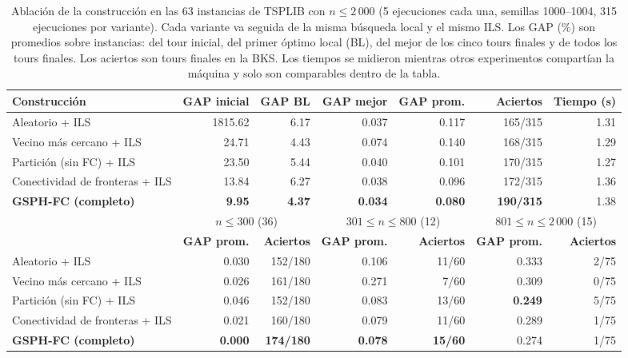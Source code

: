 \documentclass[runningheads]{llncs}
\begin{document}
\begin{table}
\caption{Ablación de la construcción en las 63 instancias de TSPLIB con
$n\le 2\,000$ (5 ejecuciones cada una, semillas 1000--1004, 315
ejecuciones por variante). Cada variante va seguida de la misma búsqueda
local y el mismo ILS. Los GAP (\%) son promedios sobre instancias: del
tour inicial, del primer óptimo local (BL), del mejor de los cinco tours
finales y de todos los tours finales. Los aciertos son tours finales en
la BKS. Los tiempos se midieron mientras otros experimentos compartían
la máquina y solo son comparables dentro de la tabla.}
\label{tab:ablation-constr}
\centering\scriptsize
\begin{tabular}{@{}lrrrrrr@{}}
\toprule
\textbf{Construcción} & \textbf{GAP inicial} & \textbf{GAP BL} & \textbf{GAP mejor} & \textbf{GAP prom.} & \textbf{Aciertos} & \textbf{Tiempo (s)}\\
\midrule
Aleatorio + ILS                  & 1815.62 & 6.17 & 0.037 & 0.117 & 165/315 & 1.31 \\
Vecino más cercano + ILS         &   24.71 & 4.43 & 0.074 & 0.140 & 168/315 & 1.29 \\
Partición (sin FC) + ILS         &   23.50 & 5.44 & 0.040 & 0.101 & 170/315 & 1.27 \\
Conectividad de fronteras + ILS  &   13.84 & 6.27 & 0.038 & 0.096 & 172/315 & 1.36 \\
\textbf{GSPH-FC (completo)}      & \textbf{9.95} & \textbf{4.37} & \textbf{0.034} & \textbf{0.080} & \textbf{190/315} & 1.38 \\
\midrule
& \multicolumn{2}{c}{$n\le 300$ (36)} & \multicolumn{2}{c}{$301\le n\le 800$ (12)} & \multicolumn{2}{c}{$801\le n\le 2\,000$ (15)}\\
\cmidrule(lr){2-3}\cmidrule(lr){4-5}\cmidrule(lr){6-7}
& \textbf{GAP prom.} & \textbf{Aciertos} & \textbf{GAP prom.} & \textbf{Aciertos} & \textbf{GAP prom.} & \textbf{Aciertos}\\
\midrule
Aleatorio + ILS                  & 0.030 & 152/180 & 0.106 & 11/60 & 0.333 & 2/75 \\
Vecino más cercano + ILS         & 0.026 & 161/180 & 0.271 &  7/60 & 0.309 & 0/75 \\
Partición (sin FC) + ILS         & 0.046 & 152/180 & 0.083 & 13/60 & \textbf{0.249} & 5/75 \\
Conectividad de fronteras + ILS  & 0.021 & 160/180 & 0.079 & 11/60 & 0.289 & 1/75 \\
\textbf{GSPH-FC (completo)}      & \textbf{0.000} & \textbf{174/180} & \textbf{0.078} & \textbf{15/60} & 0.274 & 1/75 \\
\bottomrule
\end{tabular}
\end{table}
\end{document}
